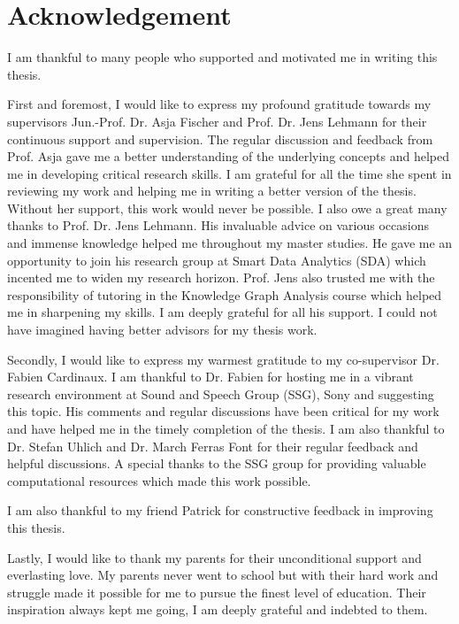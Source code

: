 \chapter*{\centering \Large Acknowledgement}

I am thankful to many people who supported and motivated me in writing this thesis.

First and foremost, I would like to express my profound gratitude towards my supervisors Jun.-Prof. Dr. Asja Fischer and Prof. Dr. Jens Lehmann for their continuous support and supervision. The regular discussion and feedback from Prof. Asja gave me a better understanding of the underlying concepts and helped me in developing critical research skills. I am grateful for all the time she spent in reviewing my work and helping me in writing a better version of the thesis. Without her support, this work would never be possible. I also owe a great many thanks to Prof. Dr. Jens Lehmann. His invaluable advice on various occasions and immense knowledge helped me throughout my master studies. He gave me an opportunity to join his research group at Smart Data Analytics (SDA) which incented me to widen my research horizon. Prof. Jens also trusted me with the responsibility of tutoring in the Knowledge Graph Analysis course which helped me in sharpening my skills. I am deeply grateful for all his support. I could not have imagined having better advisors for my thesis work.

Secondly, I would like to express my warmest gratitude to my co-supervisor Dr. Fabien Cardinaux. I am thankful to Dr. Fabien for hosting me in a vibrant research environment at Sound and Speech Group (SSG), Sony and suggesting this topic. His comments and regular discussions have been critical for my work and have helped me in the timely completion of the thesis. I am also thankful to Dr. Stefan Uhlich and Dr. March Ferras Font for their regular feedback and helpful discussions. A special thanks to the SSG group for providing valuable computational resources which made this work possible.

I am also thankful to my friend Patrick for constructive feedback in improving this thesis.

Lastly, I would like to thank my parents for their unconditional support and everlasting love. My parents never went to school but with their hard work and struggle made it possible for me to pursue the finest level of education. Their inspiration always kept me going, I am deeply grateful and indebted to them. 